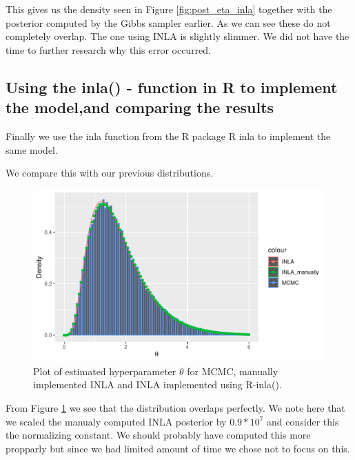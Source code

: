 This gives us the density seen in Figure \ref{fig:post_eta_inla} together with the posterior computed by the Gibbs sampler earlier. As we can see these do not completely overlap. The one using INLA is slightly slimmer. We did not have the time to further research why this error occurred.

\subsection{Using the inla() - function in R to implement the model,and comparing the results}

Finally we use the inla function from the R package R inla to implement the same model. 



We compare this with our previous distributions.
\begin{figure}[h]
    \centering
    \includegraphics[width=\textwidth]{Images/theta_comparison.pdf}
    \caption{Plot of estimated hyperparameter $\theta$ for MCMC, manually implemented INLA and INLA implemented using R-inla().}
    \label{fig:theta_comparison}
\end{figure}

From Figure \ref{fig:theta_comparison} we see that the distribution overlaps perfectly. We note here that we scaled the manualy computed INLA posterior by $0.9*10^7$ and consider this the normalizing constant. We should probably have computed this more propparly but since we had limited amount of time we chose not to focus on this. 


